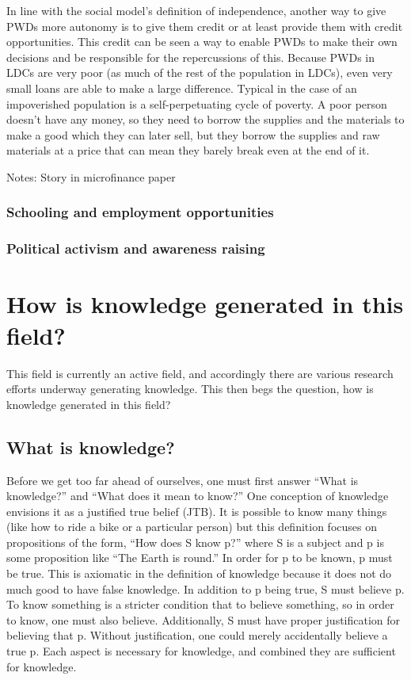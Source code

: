 \documentclass{lps}
\begin{document}
In line with the social model's definition of independence, another way to
give PWDs more autonomy is to give them credit or at least provide them with
credit opportunities. This credit can be seen a way to enable PWDs to make
their own decisions and be responsible for the repercussions of this. Because
PWDs in LDCs are very poor (as much of the rest of the population in LDCs),
even very small loans are able to make a large difference. Typical in the case
of an impoverished population is a self-perpetuating cycle of poverty. A poor
person doesn't have any money, so they need to borrow the supplies and the
materials to make a good which they can later sell, but they borrow the
supplies and raw materials at a price that can mean they barely break even at
the end of it.

Notes:
Story in microfinance paper 

\subsubsection{Schooling and employment opportunities}

\subsubsection{Political activism and awareness raising}

\section{How is knowledge generated in this field?}


This field is currently an active field, and accordingly there are various
research efforts underway generating knowledge. This then begs the question,
how is knowledge generated in this field?  

\subsection{What is knowledge?}

Before we get too far ahead of ourselves, one must first answer ``What is
knowledge?'' and ``What does it mean to know?'' One conception of knowledge
envisions it as a justified true belief (JTB). It is possible to know many
things (like how to ride a bike or a particular person) but this definition
focuses on propositions of the form, ``How does S know p?'' where S is a subject
and p is some proposition like ``The Earth is round.'' In order for p to be
known, p must be true. This is axiomatic in the definition of knowledge
because it does not do much good to have false knowledge. In addition to p
being true, S must believe p. To know something is a stricter condition that
to believe something, so in order to know, one must also believe.
Additionally, S must have proper justification for believing that p. Without
justification, one could merely accidentally believe a true p. Each aspect is
necessary for knowledge, and combined they are sufficient for knowledge.
\end{document}

